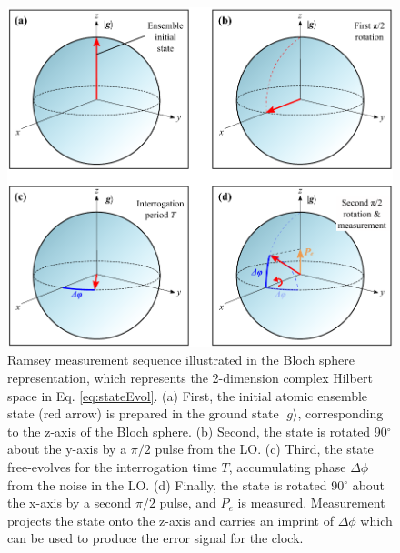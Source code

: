 \begin{figure}[hp]
    \begin{center}
        \includegraphics{figures/5/Fig_BlochRamsey}
        \caption{\label{fig:bloch} Ramsey measurement sequence illustrated in the Bloch sphere representation, which represents the 2-dimension complex Hilbert space in  Eq. \ref{eq:stateEvol}. (a) First, the initial atomic ensemble state (red arrow) is prepared in the ground state $|g \rangle$, corresponding to the z-axis of the Bloch sphere. (b) Second, the state is rotated 90$^{\circ}$ about the y-axis by a $\pi / 2$ pulse from the LO. (c) Third, the state free-evolves for the interrogation time $T$, accumulating phase $\Delta \phi$ from the noise in the LO. (d) Finally, the state is rotated 90$^{\circ}$ about the x-axis by a second $\pi / 2$ pulse, and $P_e$ is measured. Measurement projects the state onto the z-axis and carries an imprint of $\Delta \phi$ which can be used to produce the error signal for the clock. }
    \end{center}
\end{figure}


